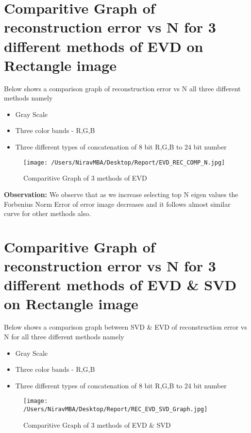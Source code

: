 \documentclass[12pt]{report}
\begin{document}
\section{Comparitive Graph of reconstruction error vs N for 3 different methods of EVD on Rectangle image }

Below shows a comparison graph of reconstruction error vs N all three different methods namely \\  

\begin{itemize}
	\item Gray Scale
	\item Three color bands - R,G,B
	\item Three different types of concatenation of 8 bit R,G,B to 24 bit number
\end{itemize}


\begin{figure}[H]
	
	\texttt{[image: /Users/NiravMBA/Desktop/Report/EVD\_REC\_COMP\_N.jpg]}
	\caption{Comparitive Graph of 3 methods of EVD}
\end{figure}


{\bfseries Observation: }
We observe that as we increase selecting top N eigen values the Forbenius Norm Error of error image decreases and it follows almost similar curve for other methods also.\\

\cleardoublepage

\section{Comparitive Graph of reconstruction error vs N for 3 different methods of EVD \& SVD on Rectangle image }

Below shows a comparison graph between SVD \& EVD of reconstruction error vs N for all three different methods namely \\  

\begin{itemize}
	\item Gray Scale
	\item Three color bands - R,G,B
	\item Three different types of concatenation of 8 bit R,G,B to 24 bit number
\end{itemize}

\begin{figure}[H]
	
	\texttt{[image: /Users/NiravMBA/Desktop/Report/REC\_EVD\_SVD\_Graph.jpg]}
	\caption{Comparitive Graph of 3 methods of EVD \& SVD}
\end{figure}
\end{document}
